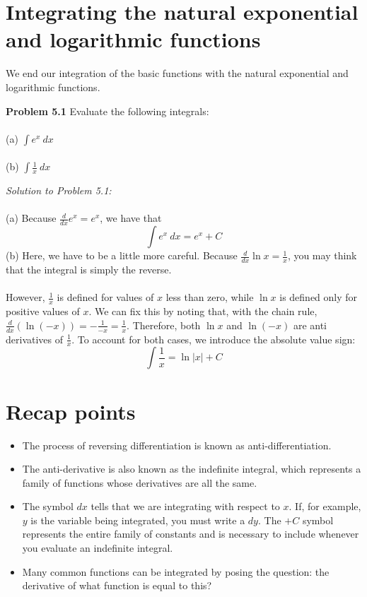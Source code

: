 \documentclass[11pt]{scrartcl}
\begin{document}
\section{Integrating the natural exponential and logarithmic functions}
\noindent 
We end our integration of the basic functions with the natural exponential and logarithmic functions. 
\begin{tcolorbox}[colback=purple!5!white,colframe=purple!75!black]
\textbf{Problem 5.1} Evaluate the following integrals: \\
\\
\noindent 
(a) \;\; $\int e^x \ dx$ \\
\\
\noindent 
(b) \;\; $\int \frac{1}{x} \ dx$
\end{tcolorbox}
\noindent 
\textit{Solution to Problem 5.1:} \\
\\
\noindent 
(a) Because $\frac{d}{dx} e^x=e^x$, we have that 
$$\int{e^x \ dx}=e^x+ C$$
\noindent 
(b) Here, we have to be a little more careful. Because $\frac{d}{dx}{\ln x}=\frac{1}{x}$, you may think that the integral is simply the reverse. \\
\\
\noindent 
However, $\frac{1}{x}$ is defined for values of $x$ less than zero, while $\ln x$ is defined only for positive values of $x$. We can fix this by noting that, with the chain rule, $\frac{d}{dx}(\ln(-x))=-\frac{1}{-x}=\frac{1}{x}$. Therefore, both $\ln x$ and $\ln(-x)$ are anti derivatives of $\frac{1}{x}$. To account for both cases, we introduce the absolute value sign:
$$\int \frac{1}{x}=\ln \lvert x \rvert +C$$
\section{Recap points}
\begin{itemize}
    \item The process of reversing differentiation is known as anti-differentiation. 
    \item The anti-derivative is also known as the indefinite integral, which represents a family of functions whose derivatives are all the same. 
    \item The symbol $dx$ tells that we are integrating with respect to $x$. If, for example, $y$ is the variable being integrated, you must write a $dy$. The $+C$ symbol represents the entire family of constants and is necessary to include whenever you evaluate an indefinite integral. 
    \item Many common functions can be integrated by posing the question: the derivative of what function is equal to this? 
\end{itemize}
\end{document}
